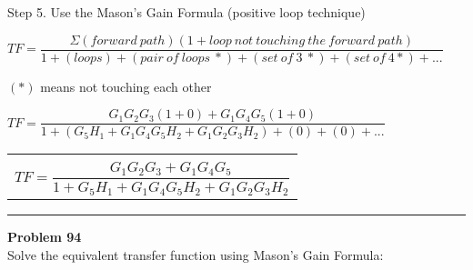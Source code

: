 \documentclass[11pt,letterpaper]{article}
\begin{document}
Step 5. Use the Mason’s Gain Formula (positive loop technique)\\
\begin{center}
	$TF=\dfrac{\Sigma (forward~path)(1 + loop~not~touching~the~forward~path)}{1 + (loops) + (pair~of~loops~*) + (set~of~3~*) + (set~of~4*) + ...}$
\end{center}
$(*)$ means not touching each other\\
\begin{center}
	$TF=\dfrac{G_1G_2G_3(1+0)+G_1G_4G_5(1+0)}{1+(G_5H_1+G_1G_4G_5H_2+G_1G_2G_3H_2)+(0)+(0)+...}$\\[12pt]
	\begin{tabular}{|c|}
		\hline \\
	$TF=\dfrac{G_1G_2G_3+G_1G_4G_5}{1+G_5H_1+G_1G_4G_5H_2+G_1G_2G_3H_2}$\\[12pt]
	\hline
	\end{tabular}
\end{center}



\clearpage

\rule{\textwidth}{1pt}
\textbf{Problem 94}\\
Solve the equivalent transfer function using Mason’s Gain Formula:\\
\end{document}
